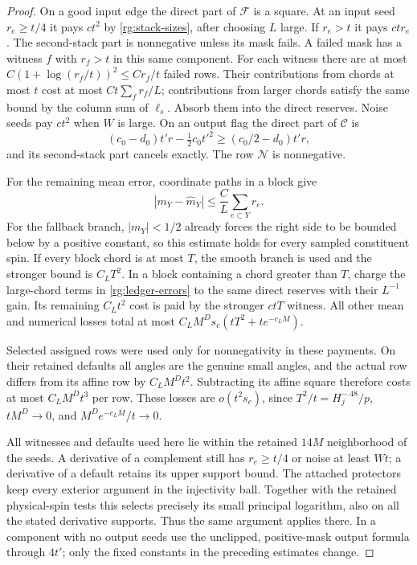 \begin{proof}
On a good input edge the direct part of $\mathcal F$ is a square.
At an input seed $r_e\ge t/4$ it pays $ct^2$ by
\eqref{rg:stack-sizes}, after choosing $L$ large.  If $r_e>t$ it
pays $ctr_e$.  The second-stack part is nonnegative unless its mask
fails.  A failed mask has a witness $f$ with $r_f>t$ in this same
component.  For each witness there are at most
$C(1+\log(r_f/t))^2\le Cr_f/t$ failed rows.  Their contributions from
chords at most $t$ cost at most $Ct\sum_fr_f/L$; contributions from
larger chords satisfy the same bound by the column sum of $\ell_s$.
Absorb them into the direct reserves.  Noise seeds pay $ct^2$ when
$W$ is large.  On an output flag the direct part of $\mathcal C$ is
\[
 (c_0-d_0)t'r-\tfrac12c_0t'^2
                    \ge(c_0/2-d_0)t'r,
\]
and its second-stack part cancels exactly.  The row
$\mathcal N$ is nonnegative.

For the remaining mean error, coordinate paths in a block give
\[
 |m_Y-\widehat m_Y|\le \frac CL\sum_{e\subset Y}r_e.
\]
For the fallback branch, $|m_Y|<1/2$ already forces the right side
to be bounded below by a positive constant, so this estimate holds
for every sampled constituent spin.  If every block chord is at
most $T$, the smooth branch is used and the stronger bound is
$C_LT^2$.  In a block containing a chord greater than $T$, charge
the large-chord terms in \eqref{rg:ledger-errors} to the same direct
reserves with their $L^{-1}$ gain.  Its remaining $C_Lt^2$ cost is
paid by the stronger $ctT$ witness.  All other mean and numerical
losses total at most
$C_LM^Ds_c(tT^2+te^{-c_LM})$.

Selected assigned rows were used only for nonnegativity in these
payments.  On their retained defaults all angles are the genuine
small angles, and the actual row differs from its affine row by
$C_LM^Dt^2$.  Subtracting its affine square therefore costs at most
$C_LM^Dt^3$ per row.  These losses are $o(t^2s_c)$, since
$T^2/t=H_j^{-.48}/p$, $tM^D\to0$, and
$M^De^{-c_LM}/t\to0$.

All witnesses and defaults used here lie within the retained $14M$
neighborhood of the seeds.  A derivative of a complement still has
$r_e\ge t/4$ or noise at least $Wt$; a derivative of a default
retains its upper support bound.  The attached protectors keep every
exterior argument in the injectivity ball.  Together with the
retained physical-spin tests this selects precisely its small
principal logarithm, also on all the stated derivative supports.
Thus the same argument applies there.  In a component with no output seeds use
the unclipped, positive-mask output formula through $4t'$; only the
fixed constants in the preceding estimates change.
\end{proof}

